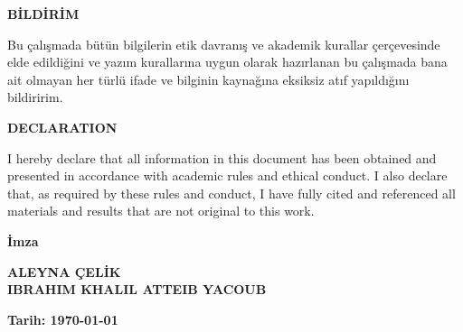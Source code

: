 \begin{center}
\textbf{BİLDİRİM}
\end{center}
\begin{singlespace}%
Bu çalışmada bütün bilgilerin etik davranış ve akademik kurallar çerçevesinde elde edildiğini ve yazım kurallarına uygun olarak hazırlanan bu çalışmada bana ait olmayan her türlü ifade ve bilginin kaynağına eksiksiz atıf yapıldığını bildiririm.
\end{singlespace}
\vspace{2cm}

\begin{center}
\textbf{DECLARATION}
\end{center}
\begin{singlespace}
I hereby declare that all information in this document has been obtained and presented in accordance with academic rules and ethical conduct. I also declare that, as required by these rules and conduct, I have fully cited and referenced all materials and results that are not original to this work.
\end{singlespace}

\vspace{3cm}
\begin{flushright}
\begin{minipage}{5cm}
\begin{center}
\textbf{İmza}

\textbf{ALEYNA ÇELİK \\ IBRAHIM KHALIL ATTEIB YACOUB}

\textbf{Tarih: {\today}}\hfill
\end{center}
\end{minipage}
\end{flushright}
